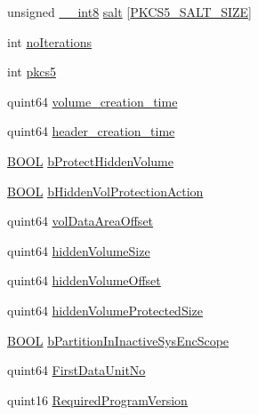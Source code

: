 \begin{DoxyCompactItemize}
\item 
unsigned \hyperlink{_gstdefs_8h_a040b30765a23a94d40af4f00f956c3a5}{\+\_\+\+\_\+int8} \hyperlink{struct_c_r_y_p_t_o___i_n_f_o__t_a01c8556fab73a760c43cb29a3ace1a35}{salt} \mbox{[}\hyperlink{_crypto_8h_a07a173a6f8a95d52202de9df7c346395}{P\+K\+C\+S5\+\_\+\+S\+A\+L\+T\+\_\+\+S\+I\+ZE}\mbox{]}
\item 
int \hyperlink{struct_c_r_y_p_t_o___i_n_f_o__t_a64de795c31018c34f7278e2482e3ccaa}{no\+Iterations}
\item 
int \hyperlink{struct_c_r_y_p_t_o___i_n_f_o__t_adc98d817e9856226490c3f21cb15f096}{pkcs5}
\item 
quint64 \hyperlink{struct_c_r_y_p_t_o___i_n_f_o__t_a23d5573e344fadcb3c53eb92ffa60aa7}{volume\+\_\+creation\+\_\+time}
\item 
quint64 \hyperlink{struct_c_r_y_p_t_o___i_n_f_o__t_a2b6ac35c524623348e02c17e9a17ee41}{header\+\_\+creation\+\_\+time}
\item 
\hyperlink{_gstdefs_8h_ae4cc35dcc70810fa972cc8a5185a28fa}{B\+O\+OL} \hyperlink{struct_c_r_y_p_t_o___i_n_f_o__t_acf83c5d5f69be9f4121dbb0cc1818cc6}{b\+Protect\+Hidden\+Volume}
\item 
\hyperlink{_gstdefs_8h_ae4cc35dcc70810fa972cc8a5185a28fa}{B\+O\+OL} \hyperlink{struct_c_r_y_p_t_o___i_n_f_o__t_a2f9295b932eec51180f7f431143d40cf}{b\+Hidden\+Vol\+Protection\+Action}
\item 
quint64 \hyperlink{struct_c_r_y_p_t_o___i_n_f_o__t_a867383eb2a6979f3cc636247da4656ac}{vol\+Data\+Area\+Offset}
\item 
quint64 \hyperlink{struct_c_r_y_p_t_o___i_n_f_o__t_a982b85fd40e3b818068410ada50a290d}{hidden\+Volume\+Size}
\item 
quint64 \hyperlink{struct_c_r_y_p_t_o___i_n_f_o__t_a9ef03a233e2524220b3e3095eaa45e46}{hidden\+Volume\+Offset}
\item 
quint64 \hyperlink{struct_c_r_y_p_t_o___i_n_f_o__t_aee6a9365e305d390ba388bda895fa6e4}{hidden\+Volume\+Protected\+Size}
\item 
\hyperlink{_gstdefs_8h_ae4cc35dcc70810fa972cc8a5185a28fa}{B\+O\+OL} \hyperlink{struct_c_r_y_p_t_o___i_n_f_o__t_a7f72494289bfb53afacbbfb8d14931b4}{b\+Partition\+In\+Inactive\+Sys\+Enc\+Scope}
\item 
quint64 \hyperlink{struct_c_r_y_p_t_o___i_n_f_o__t_aa2664b659046fe638cddfa0af0377a8d}{First\+Data\+Unit\+No}
\item 
quint16 \hyperlink{struct_c_r_y_p_t_o___i_n_f_o__t_a5782eca369210f4222ce3f28cfa6d223}{Required\+Program\+Version}
\item 

\end{DoxyCompactItemize}
